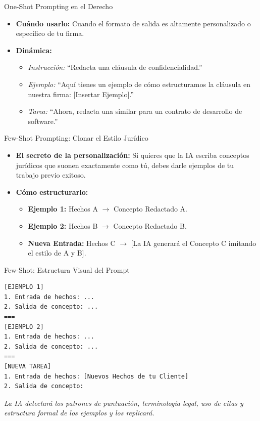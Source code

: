 \documentclass[aspectratio=169]{beamer}
\begin{document}
\begin{frame}[fragile]{One-Shot Prompting en el Derecho}


\begin{itemize}
  \item \textbf{Cuándo usarlo:} Cuando el formato de salida es altamente personalizado o específico de tu firma.
  \item \textbf{Dinámica:}
  \begin{itemize}
    \item \textit{Instrucción:} ``Redacta una cláusula de confidencialidad.''
    \item \textit{Ejemplo:} ``Aquí tienes un ejemplo de cómo estructuramos la cláusula en nuestra firma: [Insertar Ejemplo].''
    \item \textit{Tarea:} ``Ahora, redacta una similar para un contrato de desarrollo de software.''
  \end{itemize}
\end{itemize}
\end{frame}



\begin{frame}[fragile]{Few-Shot Prompting: Clonar el Estilo Jurídico}


\begin{itemize}
  \item \textbf{El secreto de la personalización:} Si quieres que la IA escriba conceptos jurídicos que suonen exactamente como tú, debes darle ejemplos de tu trabajo previo exitoso.
  \item \textbf{Cómo estructurarlo:}
  \begin{itemize}
    \item \textbf{Ejemplo 1:} Hechos A $\rightarrow$ Concepto Redactado A.
    \item \textbf{Ejemplo 2:} Hechos B $\rightarrow$ Concepto Redactado B.
    \item \textbf{Nueva Entrada:} Hechos C $\rightarrow$ [La IA generará el Concepto C imitando el estilo de A y B].
  \end{itemize}
\end{itemize}
\end{frame}



\begin{frame}[fragile]{Few-Shot: Estructura Visual del Prompt}


\begin{lstlisting}[basicstyle=\ttfamily\scriptsize]
[EJEMPLO 1]
1. Entrada de hechos: ...
2. Salida de concepto: ...
===
[EJEMPLO 2]
1. Entrada de hechos: ...
2. Salida de concepto: ...
===
[NUEVA TAREA]
1. Entrada de hechos: [Nuevos Hechos de tu Cliente]
2. Salida de concepto:
\end{lstlisting}

\textit{La IA detectará los patrones de puntuación, terminología legal, uso de citas y estructura formal de los ejemplos y los replicará.}

\end{frame}
\end{document}
